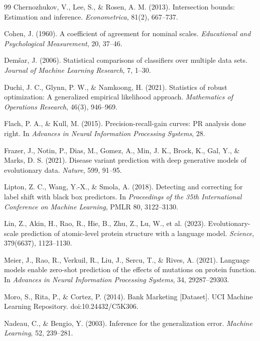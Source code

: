 \documentclass[11pt]{article}
\theoremstyle{remark}
\begin{document}
\begin{thebibliography}{99}
Chernozhukov, V., Lee, S., \& Rosen, A. M. (2013).
Intersection bounds: Estimation and inference.
\emph{Econometrica}, 81(2), 667--737.

Cohen, J. (1960).
A coefficient of agreement for nominal scales.
\emph{Educational and Psychological Measurement}, 20, 37--46.

Dem\v{s}ar, J. (2006).
Statistical comparisons of classifiers over multiple data sets.
\emph{Journal of Machine Learning Research}, 7, 1--30.

Duchi, J. C., Glynn, P. W., \& Namkoong, H. (2021).
Statistics of robust optimization: A generalized empirical likelihood approach.
\emph{Mathematics of Operations Research}, 46(3), 946--969.

Flach, P. A., \& Kull, M. (2015).
Precision-recall-gain curves: PR analysis done right.
In \emph{Advances in Neural Information Processing Systems}, 28.

Frazer, J., Notin, P., Dias, M., Gomez, A., Min, J. K., Brock, K., Gal, Y., \& Marks, D. S. (2021).
Disease variant prediction with deep generative models of evolutionary data.
\emph{Nature}, 599, 91--95.

Lipton, Z. C., Wang, Y.-X., \& Smola, A. (2018).
Detecting and correcting for label shift with black box predictors.
In \emph{Proceedings of the 35th International Conference on Machine Learning}, PMLR 80, 3122--3130.

Lin, Z., Akin, H., Rao, R., Hie, B., Zhu, Z., Lu, W., et al. (2023).
Evolutionary-scale prediction of atomic-level protein structure with a language model.
\emph{Science}, 379(6637), 1123--1130.

Meier, J., Rao, R., Verkuil, R., Liu, J., Sercu, T., \& Rives, A. (2021).
Language models enable zero-shot prediction of the effects of mutations on protein function.
In \emph{Advances in Neural Information Processing Systems}, 34, 29287--29303.

Moro, S., Rita, P., \& Cortez, P. (2014).
Bank Marketing [Dataset].
UCI Machine Learning Repository. doi:10.24432/C5K306.

Nadeau, C., \& Bengio, Y. (2003).
Inference for the generalization error.
\emph{Machine Learning}, 52, 239--281.


\end{thebibliography}
\end{document}
